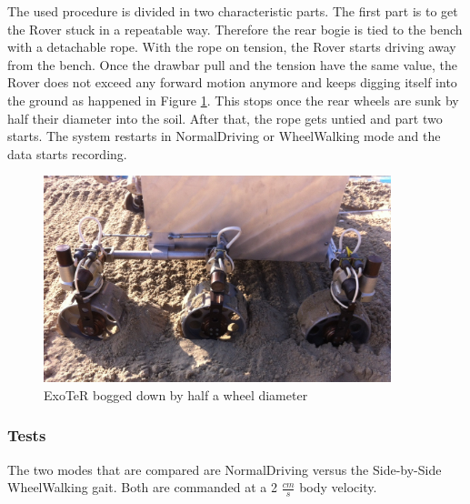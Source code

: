 \documentclass[a4paper,twocolumn]{esapub2005} %
\begin{document}
The used procedure is divided in two characteristic parts. The first part is to get the Rover stuck in a repeatable way. Therefore the rear bogie is tied to the bench with a detachable rope. With the rope on tension, the Rover starts driving away from the bench. Once the drawbar pull and the tension have the same value, the Rover does not exceed any forward motion anymore and keeps digging itself into the ground as happened in Figure \ref{fig:volleyexoterdigg}. This stops once the rear wheels are sunk by half their diameter into the soil.
After that, the rope gets untied and part two starts. The system restarts in NormalDriving or WheelWalking mode and the data starts recording. 

\begin{figure}[h!]
	\centering		\includegraphics[width=0.9\textwidth]{volleyexoterdigg.JPG}	
	\caption{ExoTeR bogged down by half a wheel diameter}
	\label{fig:volleyexoterdigg}
\end{figure}


\subsubsection{Tests}
The two modes that are compared are NormalDriving versus the Side-by-Side WheelWalking gait. Both are commanded at a 2 $\frac{cm}{s}$ body velocity. 
\end{document}
